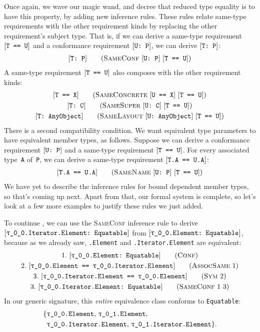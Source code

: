 \documentclass[../generics]{subfiles}
\begin{document}
Once again, we wave our magic wand, and decree that reduced type equality is to have this property, by adding new inference rules. These rules relate same-type requirements with the other requirement kinds by replacing the other requirement's subject type. That is, if we can derive a same-type requirement $[\texttt{T == U}]$ and a conformance requirement $[\texttt{U:~P}]$, we can derive $[\texttt{T:~P}]$:
\begin{gather*}
\SameConfStepDef
\end{gather*}
A same-type requirement $[\texttt{T == U}]$ also composes with the other requirement kinds:
\begin{gather*}
\SameConcreteStepDef\\
\SameSuperStepDef\\
\SameLayoutStepDef
\end{gather*}
There is a second compatibility condition. We want equivalent type parameters to have equivalent member types, as follows. Suppose we can derive a conformance requirement $[\texttt{U:~P}]$ and a same-type requirement $[\texttt{T == U}]$. For every associated type~\texttt{A} of~\texttt{P}, we can derive a same-type requirement $[\texttt{T.A == U.A}]$:
\begin{gather*}
\SameNameStepDef
\end{gather*}
We have yet to describe the inference rules for bound dependent member types, so that's coming up next. Apart from that, our formal system is complete, so let's look at a few more examples to justify these rules we just added.

\begin{example}
To continue , we can use the \textsc{SameConf} inference rule to derive $[\texttt{\texttt{$\uptau$\_0\_0}.Iterator.Element:~Equatable}]$ from $[\texttt{\texttt{$\uptau$\_0\_0}.Element:~Equatable}]$, because as we already saw, \texttt{\rT.Element} and \texttt{\rT.Iterator.Element} are equivalent:
\begin{gather*}
\ConfStep{\rT.Element}{Equatable}{1}\\
\AssocSameStep{1}{\rT.Element}{\rT.Iterator.Element}{2}\\
\SymStep{2}{\rT.Iterator.Element}{\rT.Element}{3}\\
\SameConfStep{1}{3}{$\rT$.Iterator.Element}{Equatable}{3}
\end{gather*}
In our generic signature, this \emph{entire} equivalence class conforms to \texttt{Equatable}:
\begin{align*}
\{&\texttt{\texttt{$\uptau$\_0\_0}.Element},\,\texttt{\texttt{$\uptau$\_0\_1}.Element},\,\\
&\texttt{\texttt{$\uptau$\_0\_0}.Iterator.Element},\,\texttt{\texttt{$\uptau$\_0\_1}.Iterator.Element}\}.
\end{align*}
\end{example}
\end{document}
